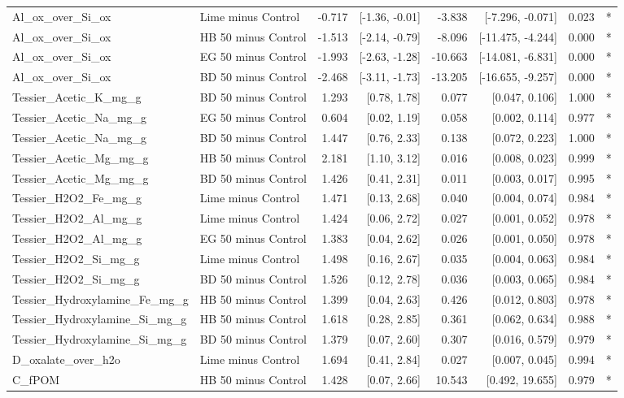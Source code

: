 \documentclass[preprint,12pt]{elsarticle}
\begin{document}
\begin{landscape}
\begin{longtable}{llrrrrrl}
Al\_ox\_over\_Si\_ox & Lime minus Control & -0.717 & [-1.36, -0.01] & -3.838 & [-7.296, -0.071] & 0.023 & * \\
Al\_ox\_over\_Si\_ox & HB 50 minus Control & -1.513 & [-2.14, -0.79] & -8.096 & [-11.475, -4.244] & 0.000 & * \\
Al\_ox\_over\_Si\_ox & EG 50 minus Control & -1.993 & [-2.63, -1.28] & -10.663 & [-14.081, -6.831] & 0.000 & * \\
Al\_ox\_over\_Si\_ox & BD 50 minus Control & -2.468 & [-3.11, -1.73] & -13.205 & [-16.655, -9.257] & 0.000 & * \\
Tessier\_Acetic\_K\_mg\_g & BD 50 minus Control & 1.293 & [0.78, 1.78] & 0.077 & [0.047, 0.106] & 1.000 & * \\
Tessier\_Acetic\_Na\_mg\_g & EG 50 minus Control & 0.604 & [0.02, 1.19] & 0.058 & [0.002, 0.114] & 0.977 & * \\
Tessier\_Acetic\_Na\_mg\_g & BD 50 minus Control & 1.447 & [0.76, 2.33] & 0.138 & [0.072, 0.223] & 1.000 & * \\
Tessier\_Acetic\_Mg\_mg\_g & HB 50 minus Control & 2.181 & [1.10, 3.12] & 0.016 & [0.008, 0.023] & 0.999 & * \\
Tessier\_Acetic\_Mg\_mg\_g & BD 50 minus Control & 1.426 & [0.41, 2.31] & 0.011 & [0.003, 0.017] & 0.995 & * \\
Tessier\_H2O2\_Fe\_mg\_g & Lime minus Control & 1.471 & [0.13, 2.68] & 0.040 & [0.004, 0.074] & 0.984 & * \\
Tessier\_H2O2\_Al\_mg\_g & Lime minus Control & 1.424 & [0.06, 2.72] & 0.027 & [0.001, 0.052] & 0.978 & * \\
Tessier\_H2O2\_Al\_mg\_g & EG 50 minus Control & 1.383 & [0.04, 2.62] & 0.026 & [0.001, 0.050] & 0.978 & * \\
Tessier\_H2O2\_Si\_mg\_g & Lime minus Control & 1.498 & [0.16, 2.67] & 0.035 & [0.004, 0.063] & 0.984 & * \\
Tessier\_H2O2\_Si\_mg\_g & BD 50 minus Control & 1.526 & [0.12, 2.78] & 0.036 & [0.003, 0.065] & 0.984 & * \\
Tessier\_Hydroxylamine\_Fe\_mg\_g & HB 50 minus Control & 1.399 & [0.04, 2.63] & 0.426 & [0.012, 0.803] & 0.978 & * \\
Tessier\_Hydroxylamine\_Si\_mg\_g & HB 50 minus Control & 1.618 & [0.28, 2.85] & 0.361 & [0.062, 0.634] & 0.988 & * \\
Tessier\_Hydroxylamine\_Si\_mg\_g & BD 50 minus Control & 1.379 & [0.07, 2.60] & 0.307 & [0.016, 0.579] & 0.979 & * \\
D\_oxalate\_over\_h2o & Lime minus Control & 1.694 & [0.41, 2.84] & 0.027 & [0.007, 0.045] & 0.994 & * \\
C\_fPOM & HB 50 minus Control & 1.428 & [0.07, 2.66] & 10.543 & [0.492, 19.655] & 0.979 & * \\
\end{longtable}


\end{landscape}
\end{document}
